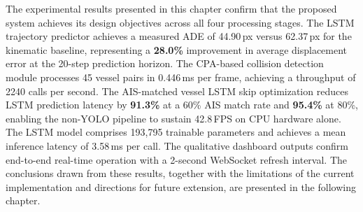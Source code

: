 
The experimental results presented in this chapter confirm that the 
proposed system achieves its design objectives across all four processing 
stages. The LSTM trajectory predictor achieves a measured ADE of 44.90\,px 
versus 62.37\,px for the kinematic baseline, representing a \textbf{28.0\%} 
improvement in average displacement error at the 20-step prediction horizon. 
The CPA-based collision detection module processes 45 vessel pairs in 
0.446\,ms per frame, achieving a throughput of 2240 calls per second. 
The AIS-matched vessel LSTM skip optimization reduces LSTM prediction 
latency by \textbf{91.3\%} at a 60\% AIS match rate and \textbf{95.4\%} 
at 80\%, enabling the non-YOLO pipeline to sustain 42.8\,FPS on CPU hardware 
alone. The LSTM model comprises 193{,}795 trainable parameters and achieves 
a mean inference latency of 3.58\,ms per call. The qualitative dashboard 
outputs confirm end-to-end real-time operation with a 2-second WebSocket 
refresh interval. The conclusions drawn from these results, together with 
the limitations of the current implementation and directions for future 
extension, are presented in the following chapter.